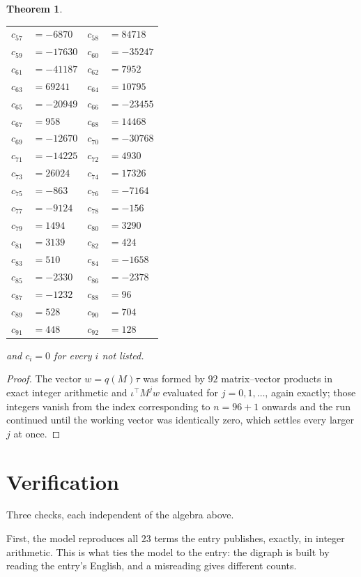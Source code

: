 \documentclass[11pt,a4paper]{article}
\theoremstyle{plain}
\newtheorem{theorem}{Theorem}
\theoremstyle{definition}
\begin{document}
\begin{theorem}
\begin{center}
\begin{tabular}{r@{\,}l@{\qquad}r@{\,}l}
$c_{57}$ & $=-6870$ & $c_{58}$ & $=84718$ \\
$c_{59}$ & $=-17630$ & $c_{60}$ & $=-35247$ \\
$c_{61}$ & $=-41187$ & $c_{62}$ & $=7952$ \\
$c_{63}$ & $=69241$ & $c_{64}$ & $=10795$ \\
$c_{65}$ & $=-20949$ & $c_{66}$ & $=-23455$ \\
$c_{67}$ & $=958$ & $c_{68}$ & $=14468$ \\
$c_{69}$ & $=-12670$ & $c_{70}$ & $=-30768$ \\
$c_{71}$ & $=-14225$ & $c_{72}$ & $=4930$ \\
$c_{73}$ & $=26024$ & $c_{74}$ & $=17326$ \\
$c_{75}$ & $=-863$ & $c_{76}$ & $=-7164$ \\
$c_{77}$ & $=-9124$ & $c_{78}$ & $=-156$ \\
$c_{79}$ & $=1494$ & $c_{80}$ & $=3290$ \\
$c_{81}$ & $=3139$ & $c_{82}$ & $=424$ \\
$c_{83}$ & $=510$ & $c_{84}$ & $=-1658$ \\
$c_{85}$ & $=-2330$ & $c_{86}$ & $=-2378$ \\
$c_{87}$ & $=-1232$ & $c_{88}$ & $=96$ \\
$c_{89}$ & $=528$ & $c_{90}$ & $=704$ \\
$c_{91}$ & $=448$ & $c_{92}$ & $=128$ \\
\end{tabular}
\end{center}
and $c_i=0$ for every $i$ not listed.
\end{theorem}

\begin{proof}
The vector $w=q(M)\tau$ was formed by $92$ matrix--vector products in exact integer
arithmetic and $\iota^{\!\top}M^{j}w$ evaluated for $j=0,1,\dots$, again exactly; those
integers vanish from the index corresponding to $n=96+1$ onwards and the run continued
until the working vector was identically zero, which settles every larger $j$ at once.
\end{proof}

\section{Verification}

Three checks, each independent of the algebra above.

First, the model reproduces all $23$ terms the entry publishes, exactly, in integer
arithmetic. This is what ties the model to the entry: the digraph is built by reading the
entry's English, and a misreading gives different counts.
\end{document}
